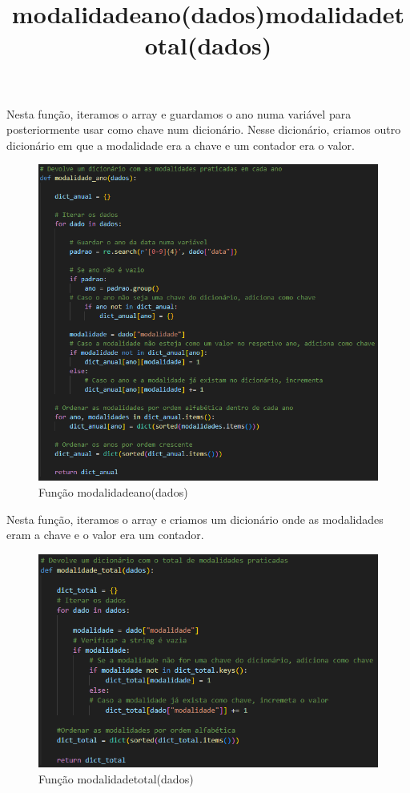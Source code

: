\documentclass[11pt,a4paper]{report}%
\begin{document}
\title{\textbf{modalidade\textunderscore ano(dados)}}

Nesta função, iteramos o array e guardamos o ano numa variável para posteriormente usar como chave num dicionário. Nesse dicionário, criamos outro dicionário em que a modalidade era a chave e um contador era o valor.
\begin{figure}[htbp]
\centerline{\includegraphics{modalidade_ano.png}}
\caption{Função modalidade\textunderscore ano(dados)}
\label{fig}
\end{figure}  

\newpage
\title{\textbf{modalidade\textunderscore total(dados)}}

Nesta função, iteramos o array e criamos um dicionário onde as modalidades eram a chave e o valor era um contador.\\
\begin{figure}[htbp]
\centerline{\includegraphics{modalidade_total.png}}
\caption{Função modalidade\textunderscore total(dados)}
\label{fig}
\end{figure} 
\end{document}
